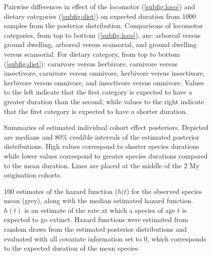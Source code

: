 \documentclass{nature}
\begin{document}
\begin{figure}[ht]
    \label{subfig:loco}
    \label{subfig:diet}
  \caption{Pairwise differences in effect of the locomotor (\ref{subfig:loco}) and dietary categories (\ref{subfig:diet}) on expected duration from 1000 samples from the posterior distribution. Comparisons of locomotor categories, from top to bottom (\ref{subfig:loco}), are: arboreal versus ground dwelling, arboreal versus scansorial, and ground dwelling versus scansorial. For dietary category, from top to bottom (\ref{subfig:diet}): carnivore versus herbivore, carnivore versus insectivore, carnivore versus omnivore, herbivore versus insectivore, herbivore versus omnivore, and insectivore versus omnivore. Values to the left indicate that the first category is expected to have a greater duration than the second, while values to the right indicate that the first category is expected to have a shorter duration.}
  \label{fig:trait_est}
\end{figure}

\begin{figure}[ht]
  \caption{}
  \label{fig:eff_other}
\end{figure}

\begin{figure}[ht]
  \caption{Summaries of estimated individual cohort effect posteriors. Depicted are medians and 80\% credible intervals of the estimated posterior distributions. High values correspond to shorter species durations while lower values correspond to greater species durations compared to the mean duration. Lines are placed at the middle of the 2 My origination cohorts.}
  \label{fig:eff_cohort}
\end{figure}

\begin{figure}[ht]
  \caption{100 estimates of the hazard function (\(h(t\)) for the observed species mean (grey), along with the median estimated hazard function. \(h(t)\) is an estimate of the rate at which a species of age \(t\) is expected to go extinct. Hazard functions were estimated from random draws from the estimated posterior distributions and evaluated with all covariate information set to 0, which corresponds to the expected duration of the mean species.}
  \label{fig:haz}
\end{figure}
\end{document}
